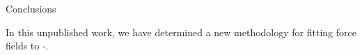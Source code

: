 \begin{section}{Conclusions}
\label{sec:lmoeda-conclusions}

In this unpublished work, we have determined a new methodology for fitting
force fields to \cus-\mofs. 

\end{section}
